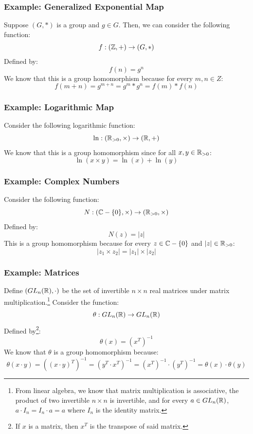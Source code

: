 \documentclass[letterpaper]{article}
\begin{document}
\subsubsection{Example: Generalized Exponential Map}
Suppose $(G, *)$ is a group and $g \in G$. Then, we can consider the following function: 
\[f: (\mathbb{Z}, +) \to (G, *)\]
Defined by: 
\[f(n) = g^n\]
We know that this is a group homomorphism because for every $m, n \in Z$:
\[f(m + n) = g^{m + n} = g^m * g^n = f(m) * f(n)\]

\subsubsection{Example: Logarithmic Map}
Consider the following logarithmic function: 
\[\ln: (\mathbb{R}_{> 0}, \times) \to (\mathbb{R}, +)\]
We know that this is a group homomorphism since for all $x, y \in \mathbb{R}_{ > 0}$: 
\[\ln(x \times y) = \ln(x) + \ln(y)\]

\subsubsection{Example: Complex Numbers}
Consider the following function: 
\[N: (\mathbb{C} - \{0\}, \times) \to (\mathbb{R}_{> 0}, \times)\]
Defined by: 
\[N(z) = |z|\]
This is a group homomorphism because for every $z \in \mathbb{C} - \{0\}$ and $|z| \in \mathbb{R}_{> 0}$:
\[|z_1 \times z_2| = |z_1| \times |z_2|\]

\subsubsection{Example: Matrices}
Define $(GL_{n}(\mathbb{R}), \cdot)$ be the set of invertible $n \times n$ real matrices under matrix multiplication.\footnote{From linear algebra, we know that matrix multiplication is associative, the product of two invertible $n \times n$ is invertible, and for every $a \in GL_{n}(\mathbb{R})$, $a \cdot I_n = I_n \cdot a = a$ where $I_n$ is the identity matrix.} Consider the function: 
\[\theta: GL_{n}(\mathbb{R}) \to GL_{n}(\mathbb{R})\]
Defined by\footnote{If $x$ is a matrix, then $x^T$ is the transpose of said matrix.}: 
\[\theta(x) = (x^T)^{-1}\]
We know that $\theta$ is a group homomorphism because: 
\[\theta(x \cdot y) = ((x \cdot y)^T)^{-1} = (y^T \cdot x^T)^{-1} = (x^T)^{-1} \cdot (y^T)^{-1} = \theta(x) \cdot \theta(y)\]
\end{document}
